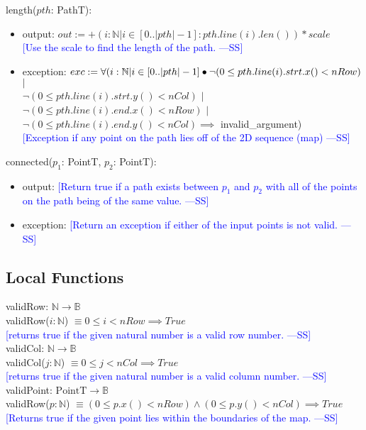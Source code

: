 \documentclass[12pt]{article}
\newcommand{\authornote}[3]{\textcolor{#1}{[#3 ---#2]}}
\newcommand{\authornote}[3]{}
\newcommand{\wss}[1]{\authornote{blue}{SS}{#1}}
\begin{document}
\noindent length($\mathit{pth}$: PathT):
\begin{itemize}
\item output: $out := +(i:\mathbb{N}|i\in[0..|pth|-1]:pth.line(i).len())*scale$\\
\wss{Use the scale to find the length of the
    path.}
\item exception: $exc := \forall(i:\mathbb{N}|i\in[0..|pth|-1] \bullet \\\lnot(0 \leq pth.line(i).strt.x() < nRow)$ $|$ \\$\lnot(0 \leq pth.line(i).strt.y() < nCol)$ $|$ \\$\lnot(0 \leq pth.line(i).end.x() < nRow)$ $|$ \\$\lnot(0 \leq pth.line(i).end.y() < nCol) \implies$ invalid\_argument)\\
\wss{Exception if any point on the path lies off of the 2D
    sequence (map)}
\end{itemize}

\noindent connected($p_1$: PointT, $p_2$: PointT):
\begin{itemize}
\item output: \wss{Return true if a path exists between $p_1$ and $p_2$ with all
    of the points on the path being of the same value.}
\item exception: \wss{Return an exception if either of the input points is not
    valid.}

\end{itemize}

\subsection*{Local Functions}

\noindent validRow: $\mathbb{N} \rightarrow \mathbb{B}$\\
\noindent validRow($i : \mathbb{N}$)
$\equiv 0 \leq i < nRow \implies True$\\
\wss{returns true if the given natural number is a valid row
  number.}\\

\noindent validCol: $\mathbb{N} \rightarrow \mathbb{B}$\\
\noindent validCol($j : \mathbb{N}$)
$\equiv 0 \leq j < nCol \implies True$\\
\noindent \wss{returns true if the given natural number is a valid column
  number.}\\

\noindent validPoint: $\mbox{PointT} \rightarrow \mathbb{B}$\\
\noindent validRow($p : \mathbb{N}$)
$\equiv (0 \leq p.x() < nRow) \land (0 \leq p.y() < nCol)\implies True$\\
\noindent \wss{Returns true if the given point lies within the boundaries of the
  map.}\\
\end{document}
